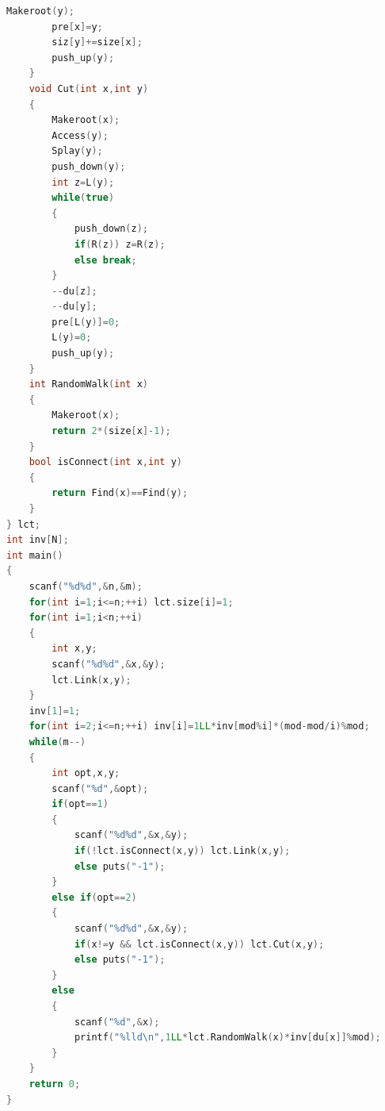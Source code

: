 \documentclass[UTF8,a4paper,titlepage]{ctexart}
\begin{document}
\begin{lstlisting}[language=C++]
        Makeroot(y);
        pre[x]=y;
        siz[y]+=size[x];
        push_up(y);
    }
    void Cut(int x,int y)
    {
        Makeroot(x);
        Access(y);
        Splay(y);
        push_down(y);
        int z=L(y);
        while(true)
        {
            push_down(z);
            if(R(z)) z=R(z);
            else break;
        }
        --du[z];
        --du[y];
        pre[L(y)]=0;
        L(y)=0;
        push_up(y);
    }
    int RandomWalk(int x)
    {
        Makeroot(x);
        return 2*(size[x]-1);
    }
    bool isConnect(int x,int y)
    {
        return Find(x)==Find(y);
    }
} lct;
int inv[N];
int main()
{
    scanf("%d%d",&n,&m);
    for(int i=1;i<=n;++i) lct.size[i]=1;
    for(int i=1;i<n;++i)
    {
        int x,y;
        scanf("%d%d",&x,&y);
        lct.Link(x,y);
    }
    inv[1]=1;
    for(int i=2;i<=n;++i) inv[i]=1LL*inv[mod%i]*(mod-mod/i)%mod;
    while(m--)
    {
        int opt,x,y;
        scanf("%d",&opt);
        if(opt==1)
        {
            scanf("%d%d",&x,&y);
            if(!lct.isConnect(x,y)) lct.Link(x,y);
            else puts("-1");
        }
        else if(opt==2)
        {
            scanf("%d%d",&x,&y);
            if(x!=y && lct.isConnect(x,y)) lct.Cut(x,y);
            else puts("-1");
        }
        else
        {
            scanf("%d",&x);
            printf("%lld\n",1LL*lct.RandomWalk(x)*inv[du[x]]%mod);
        }
    }
    return 0;
}
	\end{lstlisting}
\end{document}
